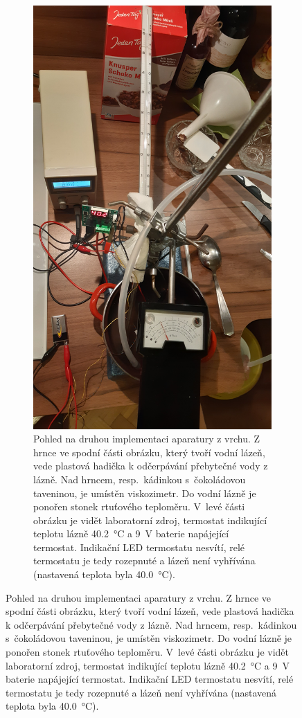 \documentclass[12pt]{article}
\begin{document}
\begin{figure}[h!]
    \begin{subfigure}[t]{.45\textwidth}
        \includegraphics[angle = 270, width = \textwidth]{prilohy/aparatura_vrch.jpg}
        \caption{Pohled na druhou implementaci aparatury z vrchu. Z hrnce ve spodní části obrázku, který tvoří vodní lázeň, vede plastová hadička k odčerpávání přebytečné vody z lázně. Nad hrncem, resp.~kádinkou s~čokoládovou taveninou, je umístěn viskozimetr. Do vodní lázně je ponořen stonek rtuťového teploměru. V~levé části obrázku je vidět laboratorní zdroj, termostat indikující teplotu lázně \SI{40,2}{\degreeCelsius} a \SI{9}{\volt} baterie napájející termostat. Indikační LED termostatu nesvítí, relé termostatu je tedy rozepnuté a lázeň není vyhřívána (nastavená teplota byla \SI{40,0}{\degreeCelsius}).}

\end{subfigure}
\end{figure}
\end{document}
